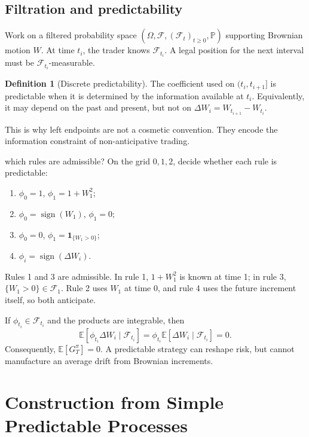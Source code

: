 \documentclass[10pt]{article}
\newcommand{\E}{\mathbb E}
\newcommand{\Pbb}{\mathbb P}
\newcommand{\1}{\mathbf 1}
\newcommand{\cF}{\mathcal F}
\theoremstyle{definition}
\newtheorem{definition}{Definition}[section]
\begin{document}
\subsection{Filtration and predictability}

Work on a filtered probability space
\((\Omega,\cF,(\cF_t)_{t\geq0},\Pbb)\) supporting Brownian motion \(W\).
At time \(t_i\), the trader knows \(\cF_{t_i}\). A legal position for the
next interval must be \(\cF_{t_i}\)-measurable.

\begin{definition}[Discrete predictability]
The coefficient used on \((t_i,t_{i+1}]\) is predictable when it is determined
by the information available at \(t_i\). Equivalently, it may depend on the
past and present, but not on \(\Delta W_i=W_{t_{i+1}}-W_{t_i}\).
\end{definition}

This is why left endpoints are not a cosmetic convention. They encode the
information constraint of non-anticipative trading.

\begin{studentexercise}{which rules are admissible?}
On the grid \(0,1,2\), decide whether each rule is predictable:
\begin{enumerate}
  \item \(\phi_0=1\), \(\phi_1=1+W_1^2\);
  \item \(\phi_0=\operatorname{sign}(W_1)\), \(\phi_1=0\);
  \item \(\phi_0=0\), \(\phi_1=\1_{\{W_1>0\}}\);
  \item \(\phi_i=\operatorname{sign}(\Delta W_i)\).
\end{enumerate}
\end{studentexercise}

\begin{shortsolution}
Rules 1 and 3 are admissible. In rule 1, \(1+W_1^2\) is known at time 1;
in rule 3, \(\{W_1>0\}\in\cF_1\). Rule 2 uses \(W_1\) at time 0, and rule
4 uses the future increment itself, so both anticipate.
\end{shortsolution}

If \(\phi_{t_i}\in\cF_{t_i}\) and the products are integrable, then
\[
\E[\phi_{t_i}\Delta W_i\mid\cF_{t_i}]
=\phi_{t_i}\E[\Delta W_i\mid\cF_{t_i}]=0.
\]
Consequently, \(\E[G_T^\pi]=0\). A predictable strategy can reshape risk,
but cannot manufacture an average drift from Brownian increments.

\section{Construction from Simple Predictable Processes}
\end{document}
